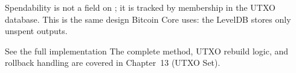 \begin{notebox}
Spendability is not a field on ; it is tracked by
membership in the UTXO database. This is the same design Bitcoin Core
uses: the  LevelDB stores only unspent outputs.
\end{notebox}

\begin{refbox}{See the full implementation}
The complete  method, UTXO rebuild
logic, and rollback handling are covered in Chapter~13 (UTXO Set).
\end{refbox}
